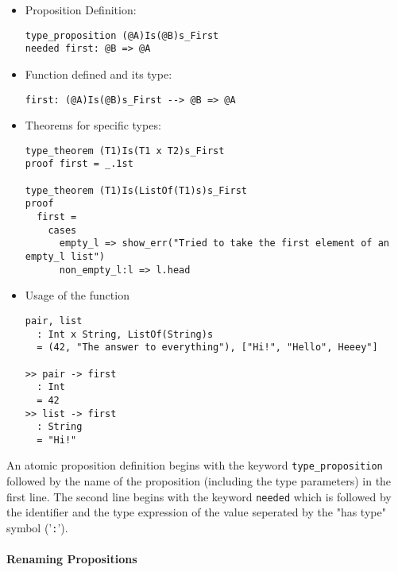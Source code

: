 \documentclass{article}
\begin{document}
\begin{itemize}
\begin{itemize}
\item Proposition Definition:

\begin{verbatim}
type_proposition (@A)Is(@B)s_First
needed first: @B => @A
\end{verbatim}

\item Function defined and its type:

\begin{verbatim}
first: (@A)Is(@B)s_First --> @B => @A
\end{verbatim}

\item Theorems for specific types:

\begin{verbatim}
type_theorem (T1)Is(T1 x T2)s_First
proof first = _.1st

type_theorem (T1)Is(ListOf(T1)s)s_First
proof
  first =
    cases
      empty_l => show_err("Tried to take the first element of an empty_l list")
      non_empty_l:l => l.head
\end{verbatim}

\item Usage of the function
\begin{verbatim}
pair, list
  : Int x String, ListOf(String)s
  = (42, "The answer to everything"), ["Hi!", "Hello", Heeey"]

>> pair -> first
  : Int
  = 42
>> list -> first
  : String
  = "Hi!"
\end{verbatim}
\end{itemize}

An atomic proposition definition begins with the keyword
\texttt{type_proposition} followed by the name of the proposition (including
the type parameters) in the first line. The second line begins with the keyword
\texttt{needed} which is followed by the identifier and the
type expression of the value seperated by the "has type" symbol ('\texttt{:}').

\end{itemize}

\newpage

\paragraph{Renaming Propositions}
\end{document}
